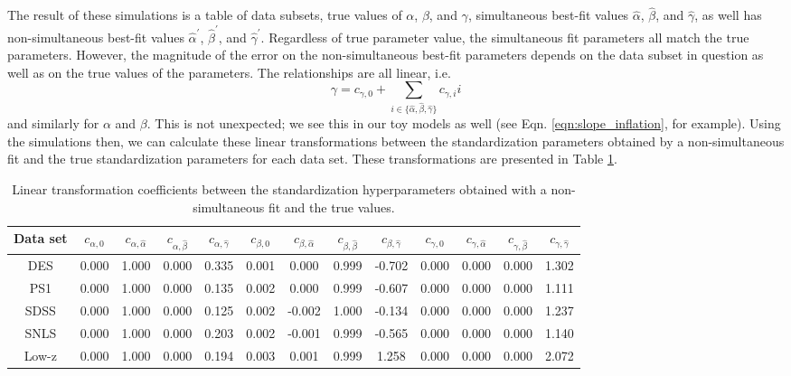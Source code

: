 The result of these simulations is a table of data subsets, true values of $\alpha$, $\beta$, and $\gamma$, simultaneous best-fit values $\hat{\alpha}$, $\hat{\beta}$, and $\hat{\gamma}$, as well has non-simultaneous best-fit values $\hat{\alpha}^\prime$, $\hat{\beta}^\prime$, and $\hat{\gamma}^\prime$. Regardless of true parameter value, the simultaneous fit parameters all match the true parameters. However, the magnitude of the error on the non-simultaneous best-fit parameters depends on the data subset in question as well as on the true values of the parameters. The relationships are all linear, i.e.
\begin{equation}
    \gamma = c_{\gamma, 0} + \displaystyle\sum_{i\in\{\hat{\alpha}, \hat{\beta}, \hat{\gamma}\}} c_{\gamma, i}i
\end{equation}
and similarly for $\alpha$ and $\beta$. This is not unexpected; we see this in our toy models as well (see Eqn. \ref{eqn:slope_inflation}, for example). Using the simulations then, we can calculate these linear transformations between the standardization parameters obtained by a non-simultaneous fit and the true standardization parameters for each data set. These transformations are presented in Table \ref{tab:trans}.

\begin{table}[h!]
\centering
    \begin{tabular}{|c||c|c|c|c||c|c|c|c||c|c|c|c|}\hline
       Data set  &  $c_{\alpha, 0}$ & $c_{\alpha,\hat{\alpha}}$ & $c_{\alpha,\hat{\beta}}$ & $c_{\alpha,\hat{\gamma}}$
       &  $c_{\beta, 0}$ &  $c_{\beta,\hat{\alpha}}$ & $c_{\beta,\hat{\beta}}$ & $c_{\beta,\hat{\gamma}}$
       &  $c_{\gamma, 0}$ &  $c_{\gamma,\hat{\alpha}}$ & $c_{\gamma,\hat{\beta}}$ & $c_{\gamma,\hat{\gamma}}$ \\\hline
        DES
        & 0.000 & 1.000 & 0.000 & 0.335
        & 0.001 & 0.000 & 0.999 & -0.702
        & 0.000 & 0.000 & 0.000 & 1.302
        \\
        PS1
        & 0.000 & 1.000 & 0.000 & 0.135
        & 0.002 & 0.000 & 0.999 & -0.607
        & 0.000 & 0.000 & 0.000 & 1.111
        \\
        SDSS
        & 0.000 & 1.000 & 0.000 & 0.125
        & 0.002 & -0.002 & 1.000 & -0.134
        & 0.000 & 0.000 & 0.000 & 1.237
        \\
        SNLS
        & 0.000 & 1.000 & 0.000 & 0.203
        & 0.002 & -0.001 & 0.999 & -0.565
        & 0.000 & 0.000 & 0.000 & 1.140
        \\
        Low-z
        & 0.000 & 1.000 & 0.000 & 0.194
        & 0.003 & 0.001 & 0.999 & 1.258
        & 0.000 & 0.000 & 0.000 & 2.072
        \\\hline
    \end{tabular}
    \caption{Linear transformation coefficients between the standardization hyperparameters obtained with a non-simultaneous fit and the true values.}
    \label{tab:trans}
\end{table}

